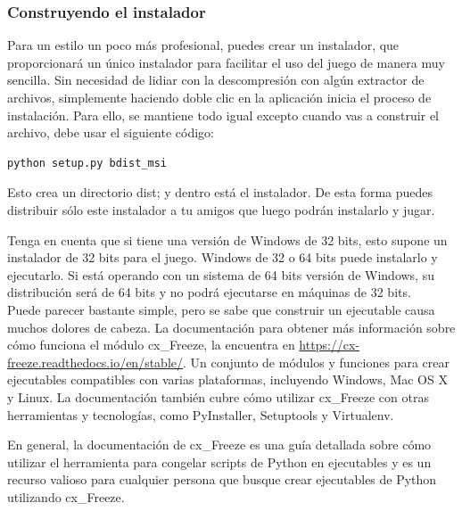 \subsubsection{Construyendo el instalador}

Para un estilo un poco más profesional,  puedes crear un instalador, que proporcionará un único instalador para facilitar el uso del juego de manera muy sencilla. Sin necesidad de lidiar con la descompresión con algún extractor de archivos,  simplemente haciendo doble clic en la aplicación inicia el proceso de instalación. Para ello, se mantiene todo igual excepto cuando vas a construir el archivo, debe usar el siguiente código:

\begin{lstlisting}		
python setup.py bdist_msi	
\end{lstlisting}	


Esto crea un directorio {\ttfamily dist}; y dentro  está el instalador.  De esta forma puedes distribuir sólo este instalador a tu amigos que luego podrán instalarlo y jugar. 


Tenga en cuenta que si tiene una versión de Windows de 32 bits, esto supone un
instalador de 32 bits para el juego. Windows de 32 o 64 bits puede instalarlo y ejecutarlo. 
Si está operando con un sistema de 64 bits versión de Windows, su distribución será de 64 bits y
 no podrá ejecutarse en máquinas de 32 bits.\\

	



Puede parecer bastante simple, pero se sabe que construir  un ejecutable causa muchos dolores de cabeza.
La documentación para obtener más información sobre cómo funciona el módulo  {\ttfamily cx\_Freeze}, la encuentra en  
\href{https://cx-freeze.readthedocs.io/en/stable/}{\color{vino}https://cx-freeze.readthedocs.io/en/stable/}.
Un conjunto de  módulos y funciones para crear ejecutables compatibles con varias plataformas, incluyendo Windows, Mac OS X y Linux.
La documentación también cubre cómo utilizar  {\ttfamily cx\_Freeze} con otras herramientas y tecnologías, como PyInstaller, Setuptools y Virtualenv. 

En general, la documentación de {\ttfamily cx\_Freeze} es una guía detallada sobre cómo utilizar el herramienta para congelar scripts de Python en ejecutables y es un recurso valioso para cualquier persona que busque crear ejecutables de Python utilizando {\ttfamily cx\_Freeze}.

